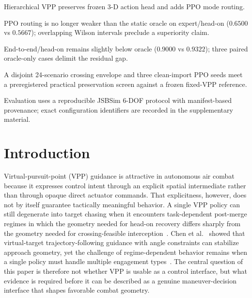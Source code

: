 \documentclass[5p,times]{elsarticle} %
\begin{document}
\begin{frontmatter}
\begin{highlights}
\item Hierarchical VPP preserves frozen 3-D action head and adds PPO mode routing.
\item PPO routing is no longer weaker than the static oracle on expert/head-on ($0.6500$ vs $0.5667$); overlapping Wilson intervals preclude a superiority claim.
\item End-to-end/head-on remains slightly below oracle ($0.9000$ vs $0.9322$); three paired oracle-only cases delimit the residual gap.
\item A disjoint 24-scenario crossing envelope and three clean-import PPO seeds meet a preregistered practical preservation screen against a frozen fixed-VPP reference.
\item Evaluation uses a reproducible JSBSim 6-DOF protocol with manifest-based provenance; exact configuration identifiers are recorded in the supplementary material.
\end{highlights}

\end{frontmatter}

\section{Introduction}

Virtual-pursuit-point (VPP) guidance is attractive in autonomous air combat because it expresses control intent through an explicit spatial intermediate rather than through opaque direct actuator commands. That explicitness, however, does not by itself guarantee tactically meaningful behavior. A single VPP policy can still degenerate into target chasing when it encounters task-dependent post-merge regimes in which the geometry needed for head-on recovery differs sharply from the geometry needed for crossing-feasible interception~\cite{xu2022ast}. Chen et al.~\cite{chen2019vpp} showed that virtual-target trajectory-following guidance with angle constraints can stabilize approach geometry, yet the challenge of regime-dependent behavior remains when a single policy must handle multiple engagement types~\cite{park2007,ratnoo2015}. The central question of this paper is therefore not whether VPP is usable as a control interface, but what evidence is required before it can be described as a genuine maneuver-decision interface that shapes favorable combat geometry.
\end{document}
